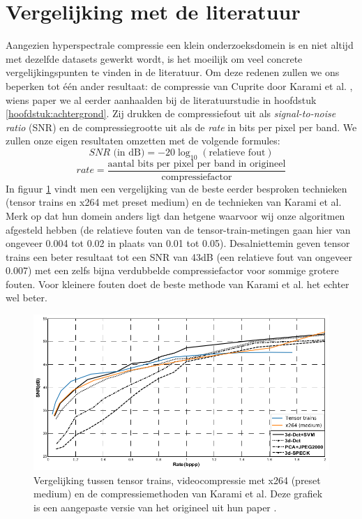 \section{Vergelijking met de literatuur}

Aangezien hyperspectrale compressie een klein onderzoeksdomein is en niet altijd met dezelfde datasets gewerkt wordt, is het moeilijk om veel concrete vergelijkingspunten te vinden in de literatuur. Om deze redenen zullen we ons beperken tot \'e\'en ander resultaat: de compressie van Cuprite door Karami et al. \cite{ref:karami}, wiens paper we al eerder aanhaalden bij de literatuurstudie in hoofdstuk \ref{hoofdstuk:achtergrond}. Zij drukken de compressiefout uit als \textit{signal-to-noise ratio} (SNR) en de compressiegrootte uit als de \textit{rate} in bits per pixel per band. We zullen onze eigen resultaten omzetten met de volgende formules:
\[
SNR \text{ (in dB)} = -20 \log_{10}(\text{relatieve fout})
\]
\[
rate = \frac{\text{aantal bits per pixel per band in origineel}}{\text{compressiefactor}}
\]
In figuur \ref{fig:literature-comparison} vindt men een vergelijking van de beste eerder besproken technieken (tensor trains en x264 met preset medium) en de technieken van Karami et al. Merk op dat hun domein anders ligt dan hetgene waarvoor wij onze algoritmen afgesteld hebben (de relatieve fouten van de tensor-train-metingen gaan hier van ongeveer 0.004 tot 0.02 in plaats van 0.01 tot 0.05). Desalniettemin geven tensor trains een beter resultaat tot een SNR van 43dB (een relatieve fout van ongeveer 0.007) met een zelfs bijna verdubbelde compressiefactor voor sommige grotere fouten. Voor kleinere fouten doet de beste methode van Karami et al. het echter wel beter.

\begin{figure}[]
  \centering
  \includegraphics[scale=0.45]{images/karami_edited.png}
  \caption{Vergelijking tussen tensor trains, videocompressie met x264 (preset medium) en de compressiemethoden van Karami et al. Deze grafiek is een aangepaste versie van het origineel uit hun paper \cite{ref:karami}.}
\label{fig:literature-comparison}
\end{figure}


